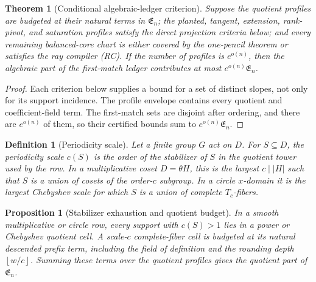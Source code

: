 \documentclass[12pt,a4paper]{amsart}
\numberwithin{equation}{section}
\newtheorem{theorem}{Theorem}[section]
\newtheorem{proposition}[proposition]{Proposition}
\newtheorem{definition}[definition]{Definition}
\theoremstyle{remark}
\newcommand{\abs}[1]{\lvert #1\rvert}
\newcommand{\floor}[1]{\left\lfloor #1\right\rfloor}
\begin{document}
\begin{theorem}[Conditional algebraic-ledger criterion]
\label{thm:smooth-circle-ledger-closure}
Suppose the quotient profiles are budgeted at their natural terms in
\(\mathfrak E_n\); the planted, tangent, extension, rank-pivot, and
saturation profiles satisfy the direct projection criteria below; and every
remaining balanced-core chart is either covered by the one-pencil theorem
or satisfies the ray compiler \textup{(RC)}.  If the number of profiles is
\(e^{o(n)}\), then the algebraic part of the first-match ledger contributes
at most \(e^{o(n)}\mathfrak E_n\).
\end{theorem}

\begin{proof}
Each criterion below supplies a bound for a set of distinct slopes, not only
for its support incidence.  The profile envelope contains every quotient
and coefficient-field term.  The first-match sets are disjoint after
ordering, and there are \(e^{o(n)}\) of them, so their certified bounds sum
to \(e^{o(n)}\mathfrak E_n\).
\end{proof}

\begin{definition}[Periodicity scale]\label{def:periodicity-scale}
Let a finite group \(G\) act on \(D\).  For \(S\subseteq D\), the periodicity scale \(c(S)\) is the order of the stabilizer of \(S\) in the quotient tower used by the row.  In a multiplicative coset \(D=\theta H\), this is the largest \(c\mid\abs H\) such that \(S\) is a union of cosets of the order-\(c\) subgroup.  In a circle \(x\)-domain it is the largest Chebyshev scale for which \(S\) is a union of complete \(T_c\)-fibers.
\end{definition}

\begin{proposition}[Stabilizer exhaustion and quotient budget]
\label{prop:stabilizer-payment}
In a smooth multiplicative or circle row, every support with \(c(S)>1\)
lies in a power or Chebyshev quotient cell.  A scale-\(c\) complete-fiber
cell is budgeted at its natural descended prefix term, including the field
of definition and the rounding depth \(\floor{w/c}\).  Summing these terms
over the quotient profiles gives the quotient part of
\(\mathfrak E_n\).
\end{proposition}
\end{document}
